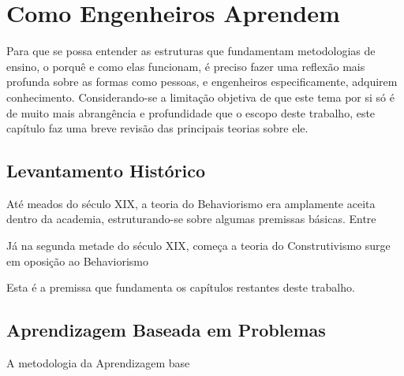 \chapter{Como Engenheiros Aprendem} \label{ch:revisao_ensino}

	Para que se possa entender as estruturas que fundamentam metodologias de ensino, o porquê e como elas funcionam, é preciso fazer uma reflexão mais profunda sobre as formas como pessoas, e engenheiros especificamente, adquirem conhecimento. Considerando-se a limitação objetiva de que este tema por si só é de muito mais abrangência e profundidade que o escopo deste trabalho, este capítulo faz uma breve revisão das principais teorias sobre ele.

	\section{Levantamento Histórico}
	
		Até meados do século XIX, a teoria do Behaviorismo era amplamente aceita dentro da academia, estruturando-se sobre algumas premissas básicas. Entre 
	
		Já na segunda metade do século XIX, começa a teoria do Construtivismo surge em oposição ao Behaviorismo
		
		Esta é a premissa que fundamenta os capítulos restantes deste trabalho.

	\section{Aprendizagem Baseada em Problemas}

		A metodologia da Aprendizagem base
